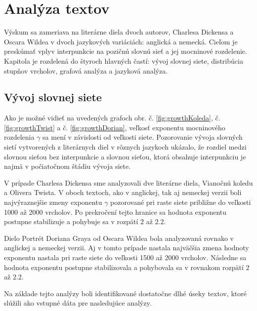 \chapter{Analýza textov}\label{ch:textAnalysis}

Výskum sa zameriava na literárne diela dvoch autorov, Charlesa Dickensa a Oscara Wildea v dvoch jazykových variáciách: anglická a nemecká.
Cieľom je preskúmať vplyv interpunkcie na pozičnú slovnú sieť a jej mocninové rozdelenie.
Kapitola je rozdelená do štyroch hlavných častí: vývoj slovnej siete, distribúcia stupňov vrcholov, grafová analýza a jazyková analýza.

\section{Vývoj slovnej siete}\label{sec:vyvojSlovnejSiete}

Ako je možné vidieť na uvedených grafoch obr. č. \ref{fig:growthKoleda}, č. \ref{fig:growthTwist} a č. \ref{fig:growthDorian},
veľkosť exponentu mocninového rozdelenia $\gamma$ sa mení v závislosti od veľkosti siete. Pozorovanie vývoja slovných sietí vytvorených z literárnych diel v rôznych
jazykoch ukázalo, že rozdiel medzi slovnou sieťou bez interpunkcie a slovnou sieťou, ktorá obsahuje interpunkciu je najmä v počiatočnom
štádiu vývoja siete. 

V prípade Charlesa Dickensa sme analyzovali dve literárne diela, Vianočnú koledu a Olivera Twista. V oboch textoch, ako v anglickej, tak aj nemeckej verzii
boli najvýraznejšie zmeny exponentu $\gamma$ pozorované pri raste siete približne do veľkosti 1000 až 2000 vrcholov. Po prekročení tejto hranice sa hodnota exponentu postupne stabilizuje
a pohybuje sa v rozpätí $2$ až $2.2$.

Dielo Portrét Doriana Graya od Oscara Wildea bola analyzovaná rovnako v anglickej a nemeckej verzii. Aj v tomto prípade nastala najväčšia zmena hodnoty exponentu nastala pri raste siete do
veľkosti 1500 až 2000 vrcholov. Následne sa hodnota exponentu postupne stabilizovala a pohybovala sa v rovnakom rozpätí $2$ až $2.2$.

Na základe tejto analýzy boli identifikované dostatočne dlhé úseky textov, ktoré slúžili ako vstupné dáta pre nasledujúce analýzy.

